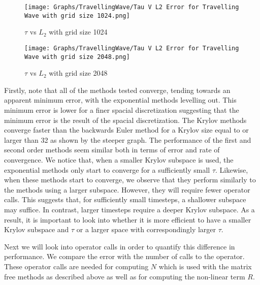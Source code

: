 \begin{figure}[H]
    \centering
    \begin{minipage}{0.49\textwidth}
        \texttt{[image: Graphs/TravellingWave/Tau V L2 Error for Travelling Wave with grid size 1024.png]} %
        \caption{$\tau$ vs $L_2$ with grid size 1024}
        \label{fig:plot1}
    \end{minipage}\hfill
    \centering
    \begin{minipage}{0.49\textwidth}
        \texttt{[image: Graphs/TravellingWave/Tau V L2 Error for Travelling Wave with grid size 2048.png]} %
        \caption{$\tau$ vs $L_2$ with grid size 2048}
        \label{fig:plot2}
    \end{minipage}\hfill
\end{figure}

Firstly, note that all of the methods tested converge, tending towards an apparent minimum error, with the exponential methods levelling out.
This minimum error is lower for a finer spacial discretization suggesting that the minimum error is the result of the spacial discretization.
The Krylov methods converge faster than the backwards Euler method for a Krylov size equal to or larger than 32 as shown by the steeper graph.
The performance of the first and second order methods seem similar both in terms of error and rate of convergence.
We notice that, when a smaller Krylov subspace is used, the exponential methods only start to converge for a sufficiently small $\tau$.
Likewise, when these methods start to converge, we observe that they perform similarly to the methods using a larger subspace.
However, they will require fewer operator calls.
This suggests that, for sufficiently small timesteps, a shallower subspace may suffice.
In contrast, larger timesteps require a deeper Krylov subspace.
As a result, it is important to look into whether it is more efficient to have a smaller Krylov subspace and $\tau$ or a larger space with correspondingly larger $\tau$.

Next we will look into operator calls in order to quantify this difference in performance.
We compare the error with the number of calls to the operator.
These operator calls are needed for computing $N$ which is used with the matrix free methods as described above as well as for computing the non-linear term $R$.

